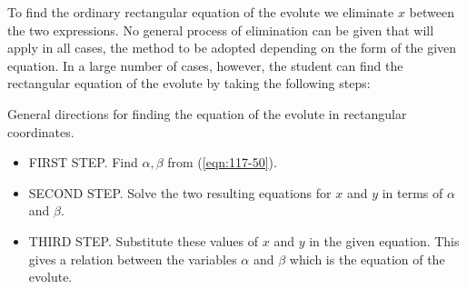 To find the ordinary rectangular equation of the evolute 
we eliminate $x$ between the two expressions. No general 
process of elimination can be given that will apply in all 
cases, the method to be adopted depending on the form of the 
given equation. In a large number of cases, however, the 
student can find the rectangular equation of the evolute by 
taking the following steps:

General directions for finding the equation of the evolute in 
rectangular coordinates.

\begin{itemize}
\item
FIRST STEP. Find $\alpha,\beta$ from (\ref{eqn:117-50}). %

\item
SECOND STEP. Solve the two resulting equations for $x$ and $y$ 
in terms of $\alpha$ and $\beta$.

\item
THIRD STEP. Substitute these values of $x$ and $y$ in the given 
equation. This gives a relation between the variables 
$\alpha$ and $\beta$ which is the equation of the evolute.
\end{itemize}

